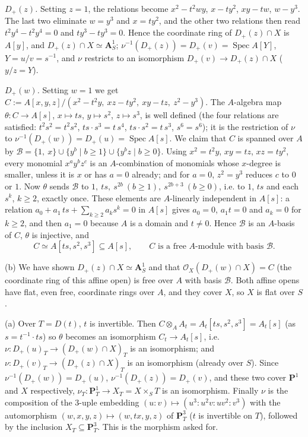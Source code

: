 \documentclass[11pt]{article}
\begin{document}
\emph{$D_+(z)$.} Setting $z=1$, the relations become $x^2-t^2wy$, $x-ty^2$, $xy-tw$, $w-y^3$. The last two eliminate $w=y^3$ and $x=ty^2$, and the other two relations then read $t^2y^4-t^2y^4=0$ and $ty^3-ty^3=0$. Hence the coordinate ring of $D_+(z)\cap X$ is $A[y]$, and $D_+(z)\cap X\simeq\mathbf A^1_S$; $\nu^{-1}(D_+(z))=D_+(v)=\operatorname{Spec}A[Y]$, $Y=u/v=s^{-1}$, and $\nu$ restricts to an isomorphism $D_+(v)\to D_+(z)\cap X$ ($y/z=Y$).

\emph{$D_+(w)$.} Setting $w=1$ we get $C:=A[x,y,z]/(x^2-t^2y,\ xz-ty^2,\ xy-tz,\ z^2-y^3)$. The $A$-algebra map $\theta:C\to A[s]$, $x\mapsto ts$, $y\mapsto s^2$, $z\mapsto s^3$, is well defined (the four relations are satisfied: $t^2s^2=t^2s^2$, $ts\cdot s^3=t\,s^4$, $ts\cdot s^2=t\,s^3$, $s^6=s^6$); it is the restriction of $\nu$ to $\nu^{-1}(D_+(w))=D_+(u)=\operatorname{Spec}A[s]$. We claim that $C$ is spanned over $A$ by $\mathcal B=\{1,\ x\}\cup\{y^b\mid b\ge1\}\cup\{y^bz\mid b\ge0\}$. Using $x^2=t^2y$, $xy=tz$, $xz=ty^2$, every monomial $x^ay^bz^c$ is an $A$-combination of monomials whose $x$-degree is smaller, unless it is $x$ or has $a=0$ already; and for $a=0$, $z^2=y^3$ reduces $c$ to $0$ or $1$. Now $\theta$ sends $\mathcal B$ to $1,\ ts,\ s^{2b}\ (b\ge1),\ s^{2b+3}\ (b\ge0)$, i.e. to $1$, $ts$ and each $s^k$, $k\ge2$, exactly once. These elements are $A$-linearly independent in $A[s]$: a relation $a_0+a_1\,ts+\sum_{k\ge2}a_ks^k=0$ in $A[s]$ gives $a_0=0$, $a_1t=0$ and $a_k=0$ for $k\ge2$, and then $a_1=0$ because $A$ is a domain and $t\ne0$. Hence $\mathcal B$ is an $A$-basis of $C$, $\theta$ is injective, and
\[ C\simeq A[ts,s^2,s^3]\subseteq A[s],\qquad C\text{ is a free }A\text{-module with basis }\mathcal B. \]

(b) We have shown $D_+(z)\cap X\simeq\mathbf A^1_S$ and that $\mathcal O_X(D_+(w)\cap X)=C$ (the coordinate ring of this affine open) is free over $A$ with basis $\mathcal B$. Both affine opens have flat, even free, coordinate rings over $A$, and they cover $X$, so $X$ is flat over $S$.

(a) Over $T=D(t)$, $t$ is invertible. Then $C\otimes_AA_t=A_t[ts,s^2,s^3]=A_t[s]$ (as $s=t^{-1}\cdot ts$) so $\theta$ becomes an isomorphism $C_t\to A_t[s]$, i.e. $\nu:D_+(u)_T\to(D_+(w)\cap X)_T$ is an isomorphism; and $\nu:D_+(v)_T\to(D_+(z)\cap X)_T$ is an isomorphism (already over $S$). Since $\nu^{-1}(D_+(w))=D_+(u)$, $\nu^{-1}(D_+(z))=D_+(v)$, and these two cover $\mathbf P^1$ and $X$ respectively, $\nu_T:\mathbf P^1_T\to X_T=X\times_ST$ is an isomorphism. Finally $\nu$ is the composition of the $3$-uple embedding $(u:v)\mapsto(u^3:u^2v:uv^2:v^3)$ with the automorphism $(w,x,y,z)\mapsto(w,tx,y,z)$ of $\mathbf P^3_T$ ($t$ is invertible on $T$), followed by the inclusion $X_T\subseteq\mathbf P^3_T$. This is the morphism asked for.
\end{document}

